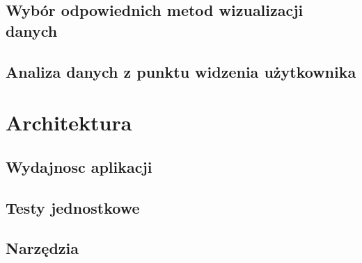 \documentclass[brudnopis]{xmgr}
\begin{document}
     \section{Wybór odpowiednich metod wizualizacji danych}

     \section{Analiza danych z punktu widzenia użytkownika}

\chapter{Architektura}

\section{Wydajnosc aplikacji}

\section{Testy jednostkowe}

\section{Narzędzia}






\listoftables

\listoffigures

\oswiadczenie
\end{document}
